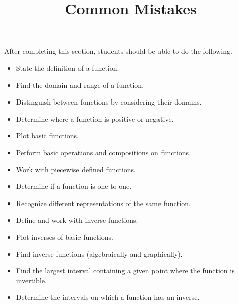 \documentclass{ximera}
\title{Common Mistakes}
\begin{document}
\begin{abstract} 
\end{abstract}

\maketitle

\begin{sectionOutcomes}
After completing this section, students should be able to do the following.

\begin{itemize}
	\item State the definition of a function.
	\item Find the domain and range of a function.
	\item Distinguish between functions by considering their domains.
	\item Determine where a function is positive or negative.
	\item Plot basic functions.
        \item Perform basic operations and compositions on
          functions.
        \item Work with piecewise defined functions.
	\item Determine if a function is one-to-one.
	\item Recognize different representations of the same function.
        \item Define and work with inverse functions.
        \item Plot inverses of basic functions.
	\item Find inverse functions (algebraically and graphically).
        \item Find the largest interval containing a given point
          where the function is invertible.
	\item Determine the intervals on which a function has an inverse.

\end{itemize}
\end{sectionOutcomes}
\end{document}
